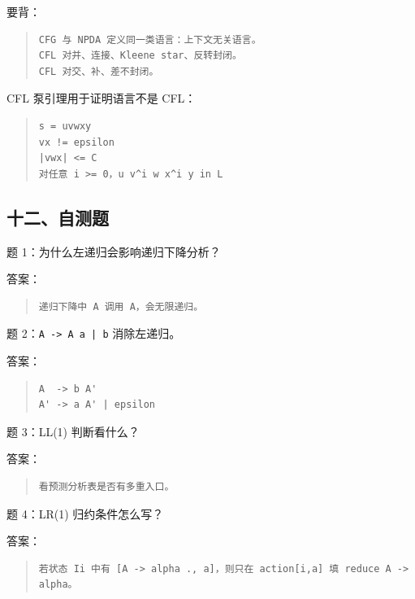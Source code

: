 \documentclass[UTF8,zihao=-4]{ctexart}
\begin{document}
要背：


\begin{quote}
\footnotesize
\begin{verbatim}
CFG 与 NPDA 定义同一类语言：上下文无关语言。
CFL 对并、连接、Kleene star、反转封闭。
CFL 对交、补、差不封闭。
\end{verbatim}
\end{quote}


CFL 泵引理用于证明语言不是 CFL：


\begin{quote}
\footnotesize
\begin{verbatim}
s = uvwxy
vx != epsilon
|vwx| <= C
对任意 i >= 0，u v^i w x^i y in L
\end{verbatim}
\end{quote}


\subsection{十二、自测题}


题 1：为什么左递归会影响递归下降分析？


答案：


\begin{quote}
\footnotesize
\begin{verbatim}
递归下降中 A 调用 A，会无限递归。
\end{verbatim}
\end{quote}


题 2：\texttt{A -> A a | b} 消除左递归。


答案：


\begin{quote}
\footnotesize
\begin{verbatim}
A  -> b A'
A' -> a A' | epsilon
\end{verbatim}
\end{quote}


题 3：LL(1) 判断看什么？


答案：


\begin{quote}
\footnotesize
\begin{verbatim}
看预测分析表是否有多重入口。
\end{verbatim}
\end{quote}


题 4：LR(1) 归约条件怎么写？


答案：


\begin{quote}
\footnotesize
\begin{verbatim}
若状态 Ii 中有 [A -> alpha ., a]，则只在 action[i,a] 填 reduce A -> alpha。
\end{verbatim}
\end{quote}
\end{document}
